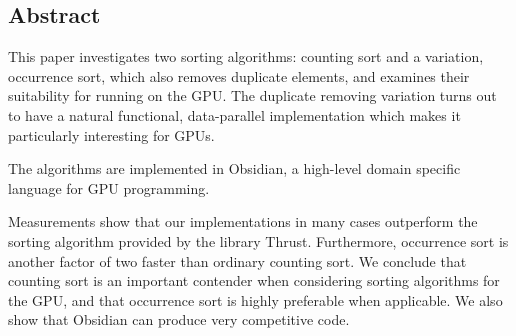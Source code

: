 \subsection*{Abstract}
This paper investigates two sorting algorithms: counting sort and a
variation, occurrence sort,  which also removes duplicate elements, 
and examines their suitability for running on the GPU. The duplicate 
removing variation
turns out to have a natural functional, data-parallel implementation
which makes it particularly interesting for GPUs.

The algorithms are implemented in Obsidian, a high-level domain
specific language for GPU programming.

Measurements show that our implementations in many cases outperform
the sorting algorithm provided by the library Thrust. Furthermore, occurrence
sort is another factor of two faster than
ordinary counting sort. We conclude that counting sort is an important
contender when considering sorting algorithms for the GPU, and that 
occurrence sort is highly preferable when applicable. We also show 
that Obsidian can produce very competitive code.











 




